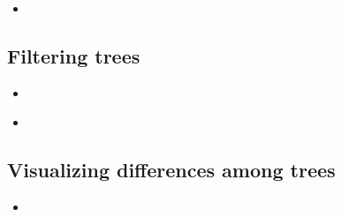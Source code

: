 \documentclass[compress, ucs, xelatex, 11pt, xcolor=x11names, aspectratio=1609,
	hyperref={
		bookmarks=true,
		unicode=true,
		colorlinks=true,
		pdftitle={HybSeq course},
		plainpages=false,
		pdfauthor={Vojtech Zeisek},
		pdfsubject={Practical processing of HybSeq target enrichment sequencing data on computing grids like MetaCentrum},
		pdfcreator={XeLaTeX},
		pdfkeywords={BASH, command line, GNU, HybSeq, Linux, MetaCentrum, sequencing shell, target enrichment},
		linkcolor=Cyan2, %
		anchorcolor=Firebrick2, %
		citecolor=Firebrick2, %
		filecolor=Firebrick2, %
		menucolor=Firebrick2, %
		urlcolor=Chartreuse2, %
		pdftex},
	url={hyphens, lowtilde} %
	]{beamer}
\begin{document}
\begin{frame}[fragile]{}
	\begin{itemize}
		\item 
	\end{itemize}
	\begin{spluscode}
    
	\end{spluscode}
	\begin{bashcode}
    
	\end{bashcode}
\end{frame}

\subsection{Filtering trees}

\begin{frame}[fragile]{}
	\begin{itemize}
		\item 
	\end{itemize}
	\begin{spluscode}
    
	\end{spluscode}
	\begin{bashcode}
    
	\end{bashcode}
\end{frame}

\begin{frame}[fragile]{}
	\begin{itemize}
		\item 
	\end{itemize}
	\begin{spluscode}
    
	\end{spluscode}
	\begin{bashcode}
    
	\end{bashcode}
\end{frame}

\subsection{Visualizing differences among trees}

\begin{frame}[fragile]{}
	\begin{itemize}
		\item 
	\end{itemize}
	\begin{spluscode}
    
	\end{spluscode}
	\begin{bashcode}
    
	\end{bashcode}
\end{frame}
\end{document}
